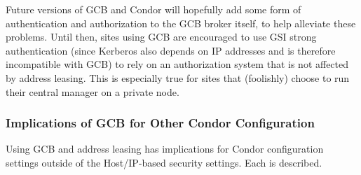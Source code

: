 Future versions of GCB and Condor will hopefully add some form of
authentication and authorization to the GCB broker itself, to help
alleviate these problems.
Until then, sites using GCB are encouraged to use GSI strong
authentication (since Kerberos also depends on IP addresses and is
therefore incompatible with GCB) to rely on an authorization system
that is not affected by address leasing.
This is especially true for sites that (foolishly) choose to run their
central manager on a private node.


\subsubsection{\label{sec:GCB-config-implications}Implications of
GCB for Other Condor Configuration} 

Using GCB and address leasing has implications for Condor
configuration settings outside of the Host/IP-based security
settings.
Each is described. 

